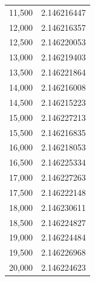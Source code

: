\documentclass{article}
\theoremstyle{definition}
\begin{document}
\begin{center}
\begin{multicols*}{3}
\begin{supertabular*}{.26\textwidth}{rl}
		11,500 & 2.146216447 \\
		12,000 & 2.146216357 \\
		12,500 & 2.146220053 \\
		13,000 & 2.146219403 \\
		13,500 & 2.146221864 \\
		14,000 & 2.146216008 \\
		14,500 & 2.146215223 \\
		15,000 & 2.146227213 \\
		15,500 & 2.146216835 \\
		16,000 & 2.146218053 \\
		16,500 & 2.146225334 \\
		17,000 & 2.146227263 \\
		17,500 & 2.146222148 \\
		18,000 & 2.146230611 \\
		18,500 & 2.146224827 \\
		19,000 & 2.146224484 \\
		19,500 & 2.146226968 \\
		20,000 & 2.146224623 \\
		\end{supertabular*}
	\end{multicols*}
	\end{center}
	
	



\printbibliography[heading=bibintoc]
\end{document}
